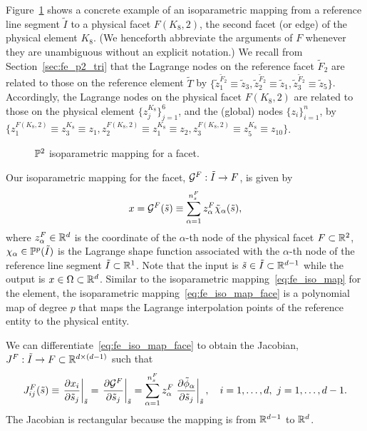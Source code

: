 Figure~\ref{fig:fe_impl_isomap_face_p2} shows a concrete example of an isoparametric mapping from a reference line segment $\tilde I$ to a physical facet $F(K_8,2)$, the second facet (or edge) of the physical element $K_8$.  (We henceforth abbreviate the arguments of $F$ whenever they are unambiguous without an explicit notation.) We recall from Section~\ref{sec:fe_p2_tri} that the Lagrange nodes on the reference facet $\tilde F_2$ are related to those on the reference element $\tilde T$ by $\{ \tilde z_1^{\tilde F_2} \equiv \tilde z_3, \tilde z_2^{\tilde F_2} \equiv \tilde z_1, \tilde z_3^{\tilde F_2} \equiv \tilde z_5 \}$.  Accordingly, the Lagrange nodes on the physical facet $F(K_8,2)$ are related to those on the physical element $\{z^{K_8}_j\}_{j=1}^6$, and the (global) nodes $\{z_i\}_{i=1}^n$,  by $\{z_1^{F(K_8,2)} \equiv z^{K_8}_3 \equiv z_1, z_2^{F(K_8,2)} \equiv z^{K_8}_1 \equiv z_2, z_3^{F(K_8,2)} \equiv z^{K_8}_5 \equiv z_{10} \}$. 
\begin{figure}
  \centering
  \caption{$\mathbb{P}^2$ isoparametric mapping for a facet. \label{fig:fe_impl_isomap_face_p2}}
\end{figure}
Our isoparametric mapping for the facet, $\mathcal{G}^F: \tilde I \to F$, is given by
\begin{equation}
  x = \mathcal{G}^F(\tilde s) \equiv \sum_{\alpha=1}^{n_s^F} z^F_\alpha \tilde \chi_{\alpha}(\tilde s),
  \label{eq:fe_iso_map_face}
\end{equation}
where $z^F_\alpha \in \mathbb{R}^d$ is the coordinate of the $\alpha$-th node of the physical facet $F \subset \mathbb{R}^2$, $\chi_{\alpha} \in \mathbb{P}^p(\tilde I)$ is the Lagrange shape function associated with the $\alpha$-th node of the reference line segment $\tilde I \subset \mathbb{R}^1$.  Note that the input is $\tilde s \in \tilde I \subset \mathbb{R}^{d-1}$ while the output is $x \in \Omega \subset \mathbb{R}^d$.  Similar to the isoparametric mapping~\eqref{eq:fe_iso_map} for the element, the isoparametric mapping~\eqref{eq:fe_iso_map_face} is a polynomial map of degree $p$ that maps the Lagrange interpolation points of the reference entity to the physical entity.

We can differentiate~\eqref{eq:fe_iso_map_face} to obtain the Jacobian, $J^F: \tilde I \to F \subset \mathbb{R}^{d \times (d-1)}$ such that
\begin{equation*}
  J^F_{ij}(\tilde s)
  \equiv
  \left. \frac{\partial x_i}{\partial \tilde s_j} \right|_{\tilde s}
  =
  \left. \frac{\partial \mathcal{G}^F}{\partial \tilde s_j} \right|_{\tilde s}
  =
  \sum_{\alpha = 1}^{n_s^F} z^F_\alpha \left. \frac{\partial \tilde \phi_\alpha}{\partial \tilde s_j} \right|_{\tilde s},
  \quad i = 1,\dots,d, \ j = 1,\dots,d-1.
\end{equation*}
The Jacobian is rectangular because the mapping is from $\mathbb{R}^{d-1}$ to $\mathbb{R}^d$.

